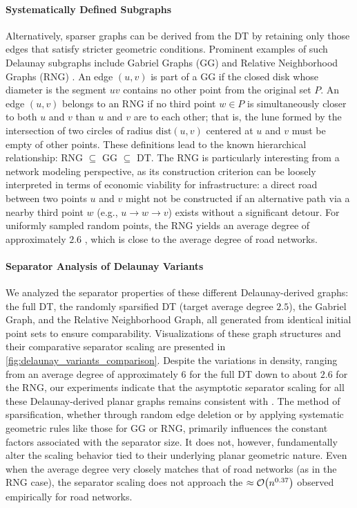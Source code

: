 \paragraph{Systematically Defined Subgraphs}
Alternatively, sparser graphs can be derived from the DT by retaining only those edges that satisfy stricter geometric conditions. Prominent examples of such Delaunay subgraphs include Gabriel Graphs (GG) \cite{gabriel_new_1969} and Relative Neighborhood Graphs (RNG) \cite{toussaint_relative_1980}.
An edge \((u,v)\) is part of a GG if the closed disk whose diameter is the segment \(uv\) contains no other point from the original set \(P\).
An edge \((u,v)\) belongs to an RNG if no third point \(w \in P\) is simultaneously closer to both \(u\) and \(v\) than \(u\) and \(v\) are to each other; that is, the lune formed by the intersection of two circles of radius \(\text{dist}(u,v)\) centered at \(u\) and \(v\) must be empty of other points.
These definitions lead to the known hierarchical relationship: RNG \(\subseteq\) GG \(\subseteq\) DT.
The RNG is particularly interesting from a network modeling perspective, as its construction criterion can be loosely interpreted in terms of economic viability for infrastructure: a direct road between two points \(u\) and \(v\) might not be constructed if an alternative path via a nearby third point \(w\) (e.g., \(u \to w \to v\)) exists without a significant detour.
For uniformly sampled random points, the RNG yields an average degree of approximately \(2.6\) \cite{buhl_topological_2006}, which is close to the average degree of road networks.

\paragraph{Separator Analysis of Delaunay Variants}
We analyzed the separator properties of these different Delaunay-derived graphs: the full DT, the randomly sparsified DT (target average degree \(2.5\)), the Gabriel Graph, and the Relative Neighborhood Graph, all generated from identical initial point sets to ensure comparability.
Visualizations of these graph structures and their comparative separator scaling are presented in \cref{fig:delaunay_variants_comparison}.
Despite the variations in density, ranging from an average degree of approximately 6 for the full DT down to about \(2.6\) for the RNG, our experiments indicate that the asymptotic separator scaling for all these Delaunay-derived planar graphs remains consistent with .
The method of sparsification, whether through random edge deletion or by applying systematic geometric rules like those for GG or RNG, primarily influences the constant factors associated with the separator size. It does not, however, fundamentally alter the  scaling behavior tied to their underlying planar geometric nature.
Even when the average degree very closely matches that of road networks (as in the RNG case), the separator scaling does not approach the \(\approx \mathcal{O}\!\left(n^{0.37}\right)\) observed empirically for road networks.

